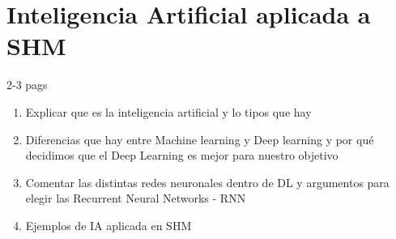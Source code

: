 









\clearpage



\section{Inteligencia Artificial aplicada a SHM}  %

2-3 pags

\begin{enumerate}
    \item Explicar que es la inteligencia artificial y lo tipos que hay
    \item Diferencias que hay entre Machine learning y Deep learning y por qué decidimos que el Deep Learning es mejor para nuestro objetivo
    \item Comentar las distintas redes neuronales dentro de DL y argumentos para elegir las Recurrent Neural Networks - RNN
    \item Ejemplos de IA aplicada en SHM
\end{enumerate}

